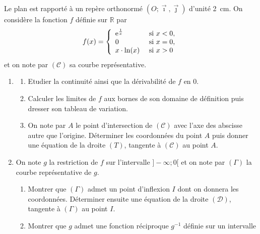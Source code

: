       \begin{exo}
            Le plan est rapport\'e \`a un rep\`ere orthonorm\'e $(O ; \vec{\imath} , \vec{\jmath})$
            d'unit\'e 2~cm.
            On consid\`ere la fonction $f$ d\'efinie sur $\mathbb{R}$ par 
            \[
                  f(x) = 
                  \left\lbrace
                        \begin{array}{l  l}
                              \mathrm{e}^{\frac{1}{x}} & \text{ si } x < 0,      \\
                              0                  & \text{ si } x = 0,      \\
                              x \cdot \ln (x)    & \text{ si } x > 0
                        \end{array}
                  \right.
            \]
            et on note par $(\mathscr{C})$ sa courbe repr\'esentative.
            \begin{enumerate}
                  \item 
                  \begin{enumerate}
                        \item Etudier la continuit\'e ainsi que la d\'erivabilit\'e de $f$ en $0$.
                        \item Calculer les limites de $f$ aux bornes de son domaine de d\'efinition
                              puis dresser son tableau de variation.
                        \item On note par $A$ le point d'intersection de $(\mathscr{C})$ avec l'axe des abscisse
                              autre que l'origine.
                              D\'eterminer les coordonn\'ees du point $A$ puis donner une \'equation 
                              de la droite $(T)$, tangente \`a $(\mathscr{C})$ au point $A$.
                  \end{enumerate}
                  \item On note $g$ la restriction de $f$ sur l'intervalle $]-\infty ; 0[$ 
                        et on note par $(\Gamma)$ la courbe repr\'esentative de $g$.
                  \begin{enumerate}
                        \item Montrer que $(\Gamma)$ admet un point d'inflexion $I$ dont on donnera les coordonn\'ees.
                              D\'eterminer ensuite une \'equation de la droite $(\mathscr{D})$,
                              tangente \`a $(\Gamma)$ au point $I$.
                        \item Montrer que $g$ admet une fonction r\'eciproque $g^{-1}$ d\'efinie sur un intervalle 

\end{enumerate}
\end{enumerate}
\end{exo}
